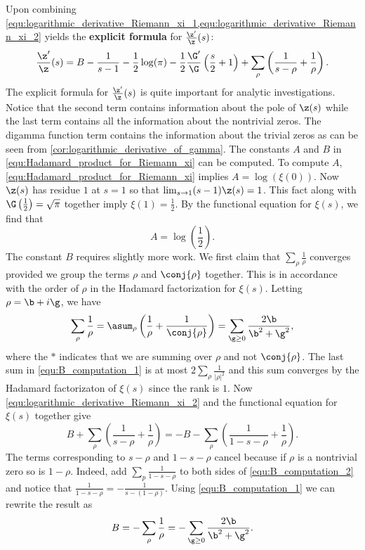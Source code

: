       Upon combining \cref{equ:logarithmic_derivative_Riemann_xi_1,equ:logarithmic_derivative_Riemann_xi_2} yields the \textbf{explicit formula} for $\frac{\z'}{\z}(s)$:
      \[
        \frac{\z'}{\z}(s) = B-\frac{1}{s-1}-\frac{1}{2}\log(\pi)-\frac{1}{2}\frac{\G'}{\G}\left(\frac{s}{2}+1\right)+\sum_{\rho}\left(\frac{1}{s-\rho}+\frac{1}{\rho}\right).
      \]
      The explicit formula for $\frac{\z'}{\z}(s)$ is quite important for analytic investigations. Notice that the second term contains information about the pole of $\z(s)$ while the last term contains all the information about the nontrivial zeros. The digamma function term contains the information about the trivial zeros as can be seen from \cref{cor:logarithmic_derivative_of_gamma}. The constants $A$ and $B$ in \cref{equ:Hadamard_product_for_Riemann_xi} can be computed. To compute $A$, \cref{equ:Hadamard_product_for_Riemann_xi} implies $A = \log(\xi(0))$. Now $\z(s)$ has residue $1$ at $s = 1$ so that $\lim_{s \to 1}(s-1)\z(s) = 1$. This fact along with $\G\left(\frac{1}{2}\right) = \sqrt{\pi}$ together imply $\xi(1) = \frac{1}{2}$. By the functional equation for $\xi(s)$, we find that
      \[
        A = \log\left(\frac{1}{2}\right).
      \]
      The constant $B$ requires slightly more work. We first claim that $\sum_{\rho}\frac{1}{\rho}$ converges provided we group the terms $\rho$ and $\conj{\rho}$ together. This is in accordance with the order of $\rho$ in the Hadamard factorization for $\xi(s)$. Letting $\rho = \b+i\g$, we have
      \begin{equation}\label{equ:B_computation_1}
        \sum_{\rho}\frac{1}{\rho} = \asum_{\rho}\left(\frac{1}{\rho}+\frac{1}{\conj{\rho}}\right) = \sum_{\g \ge 0}\frac{2\b}{\b^{2}+\g^{2}},
      \end{equation}
      where the $\ast$ indicates that we are summing over $\rho$ and not $\conj{\rho}$. The last sum in \cref{equ:B_computation_1} is at most $2\sum_{\rho}\frac{1}{|\rho|^{2}}$ and this sum converges by the Hadamard factorizaton of $\xi(s)$ since the rank is $1$. Now \cref{equ:logarithmic_derivative_Riemann_xi_2} and the functional equation for $\xi(s)$ together give
      \begin{equation}\label{equ:B_computation_2}
        B+\sum_{\rho}\left(\frac{1}{s-\rho}+\frac{1}{\rho}\right) = -B-\sum_{\rho}\left(\frac{1}{1-s-\rho}+\frac{1}{\rho}\right).
      \end{equation}
      The terms corresponding to $s-\rho$ and $1-s-\rho$ cancel because if $\rho$ is a nontrivial zero so is $1-\rho$. Indeed, add $\sum_{p}\frac{1}{1-s-\rho}$ to both sides of \cref{equ:B_computation_2} and notice that $\frac{1}{1-s-\rho} = -\frac{1}{s-(1-\rho)}$. Using \cref{equ:B_computation_1} we can rewrite the result as
      \[
        B = -\sum_{\rho}\frac{1}{\rho} = -\sum_{\g \ge 0}\frac{2\b}{\b^{2}+\g^{2}}.
      \]
